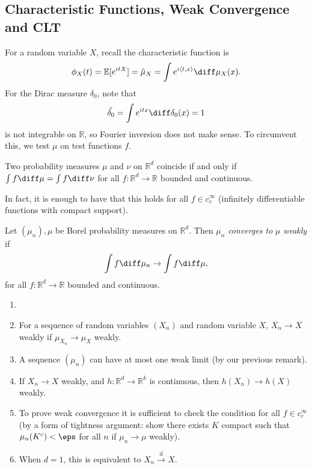 \documentclass[12pt]{article}
\begin{document}
\subsection{Characteristic Functions, Weak Convergence and CLT}
\label{sub:chr_clt}

For a random variable $X$, recall the characteristic function is
\[
\phi_X(t) = \mathbb{E}[e^{itX}] = \hat \mu_X = \int e^{i\langle t, x\rangle} \diff \mu_X(x).
\]
For the Dirac measure $\delta_0$, note that
\[
	\hat{\delta_0} = \int e^{itx} \diff \delta_0(x) = 1
\]
is not integrable on $\mathbb{R}$, so Fourier inversion does not make sense. To circumvent this, we test $\mu$ on test functions $f$.
\begin{remark}
	Two probability measures $\mu$ and $\nu$ on $\mathbb{R}^{d}$ coincide if and only if $\int f \diff \mu = \int f \diff \nu$ for all  $f : \mathbb{R}^d \to \mathbb{R}$ bounded and continuous.

	In fact, it is enough to have that this holds for all $f \in c_c^\infty$ (infinitely differentiable functions with compact support).
\end{remark}

\begin{definition}
	Let $(\mu_n), \mu$ be Borel probability measures on $\mathbb{R}^d$. Then $\mu_n$ \emph{converges to} $\mu$ \emph{weakly} if
	\[
	\int f \diff \mu_n \to \int f \diff \mu,
	\]
	for all $f : \mathbb{R}^d \to \mathbb{R}$ bounded and continuous.
\end{definition}

\begin{remark}
	\begin{enumerate}
		\item[]
		\item For a sequence of random variables $(X_n)$ and random variable $X$, $X_n \to X$ weakly if $\mu_{X_n} \to \mu_X$ weakly.
		\item A sequence $(\mu_n)$ can have at most one weak limit (by our previous remark).
		\item If $X_n \to X$ weakly, and $h : \mathbb{R}^d \to \mathbb{R}^k$ is continuous, then $h(X_n) \to h(X)$ weakly.
		\item To prove weak convergence it is sufficient to check the condition for all $f \in c_c^\infty$ (by a form of tightness argument: show there exists $K$ compact such that $\mu_n(K^{c}) < \eps$ for all $n$ if $\mu_n \to \mu$ weakly).
		\item When $d = 1$, this is equivalent to $X_n \overset{\text{d}}{\to} X$.
	\end{enumerate}
\end{remark}
\end{document}
